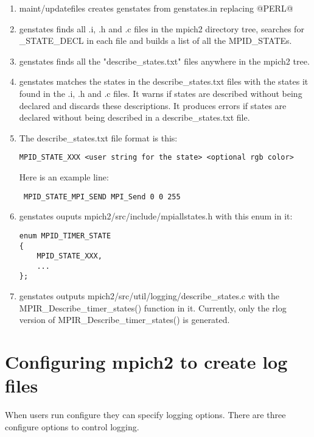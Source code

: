 \documentclass[dvipdfm,11pt]{article}
\begin{document}
\begin{enumerate}
\item maint/updatefiles creates genstates from genstates.in replacing @PERL@

\item genstates finds all .i, .h and .c files in the mpich2 directory tree,
 searches for \_STATE\_DECL in each file and builds a list of all the MPID\_STATEs.

\item genstates finds all the "describe\_states.txt" files anywhere in the mpich2
 tree.

\item genstates matches the states in the describe\_states.txt files with the 
 states it found in the .i, .h and .c files.  It warns if states are described
 without being declared and discards these descriptions.  It produces errors
 if states are declared without being described in a describe\_states.txt file.

\item The describe\_states.txt file format is this:
\begin{verbatim}
MPID_STATE_XXX <user string for the state> <optional rgb color>
\end{verbatim}
 Here is an example line:
\begin{verbatim}
 MPID_STATE_MPI_SEND MPI_Send 0 0 255
\end{verbatim}
 
\item genstates ouputs mpich2/src/include/mpiallstates.h with this enum in it:
\begin{verbatim}
enum MPID_TIMER_STATE
{
    MPID_STATE_XXX,
    ...
};
\end{verbatim}

\item genstates outputs mpich2/src/util/logging/describe\_states.c with the
 MPIR\_Describe\_timer\_states() function in it.  Currently, only the rlog
 version of MPIR\_Describe\_timer\_states() is generated.

\end{enumerate}

\section{Configuring mpich2 to create log files}
\label{sec:configuring}

When users run configure they can specify logging options.  There are three configure
options to control logging.
\end{document}
